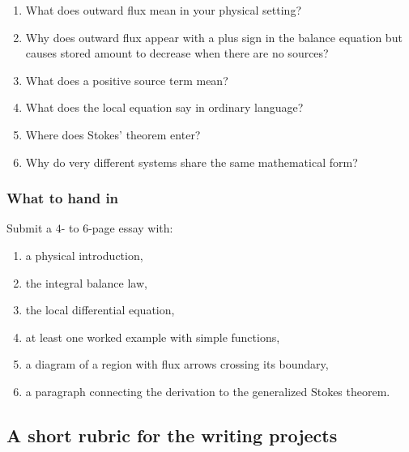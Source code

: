 \begin{enumerate}
\item What does outward flux mean in your physical setting?

\item Why does outward flux appear with a plus sign in the balance equation but causes
stored amount to decrease when there are no sources?

\item What does a positive source term mean?

\item What does the local equation say in ordinary language?

\item Where does Stokes' theorem enter?

\item Why do very different systems share the same mathematical form?
\end{enumerate}

\subsubsection*{What to hand in}

Submit a \(4\)- to \(6\)-page essay with:

\begin{enumerate}
\item a physical introduction,

\item the integral balance law,

\item the local differential equation,

\item at least one worked example with simple functions,

\item a diagram of a region with flux arrows crossing its boundary,

\item a paragraph connecting the derivation to the generalized Stokes theorem.
\end{enumerate}

\subsection*{A short rubric for the writing projects}

